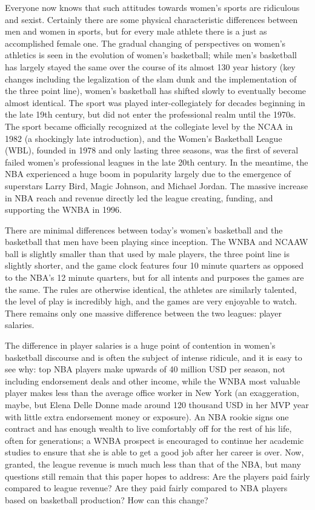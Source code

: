 \documentclass[12pt]{article}
\begin{document}
Everyone now knows that such attitudes towards women’s sports are ridiculous and sexist. Certainly there are some physical characteristic differences between men and women in sports, but for every male athlete there is a just as accomplished female one. The gradual changing of perspectives on women’s athletics is seen in the evolution of women’s basketball; while men’s basketball has largely stayed the same over the course of its almost 130 year history (key changes including the legalization of the slam dunk and the implementation of the three point line), women’s basketball has shifted slowly to eventually become almost identical. The sport was played inter-collegiately for decades beginning in the late 19th century, but did not enter the professional realm until the 1970s. The sport became officially recognized at the collegiate level by the NCAA in 1982 (a shockingly late introduction), and the Women’s Basketball League (WBL), founded in 1978 and only lasting three seasons, was the first of several failed women’s professional leagues in the late 20th century. In the meantime, the NBA experienced a huge boom in popularity largely due to the emergence of superstars Larry Bird, Magic Johnson, and Michael Jordan. The massive increase in NBA reach and revenue directly led the league creating, funding, and supporting the WNBA in 1996.
\par
There are minimal differences between today's women’s basketball and the basketball that men have been playing since inception. The WNBA and NCAAW ball is slightly smaller than that used by male players, the three point line is slightly shorter, and the game clock features four 10 minute quarters as opposed to the NBA’s 12 minute quarters, but for all intents and purposes the games are the same. The rules are otherwise identical, the athletes are similarly talented, the level of play is incredibly high, and the games are very enjoyable to watch. There remains only one massive difference between the two leagues: player salaries.
\par
The difference in player salaries is a huge point of contention in women’s basketball discourse and is often the subject of intense ridicule, and it is easy to see why: top NBA players make upwards of 40 million USD per season, not including endorsement deals and other income, while the WNBA most valuable player makes less than the average office worker in New York (an exaggeration, maybe, but Elena Delle Donne made around 120 thousand USD in her MVP year with little extra endorsement money or exposure). An NBA rookie signs one contract and has enough wealth to live comfortably off for the rest of his life, often for generations; a WNBA prospect is encouraged to continue her academic studies to ensure that she is able to get a good job after her career is over. Now, granted, the league revenue is much much less than that of the NBA, but many questions still remain that this paper hopes to address: Are the players paid fairly compared to league revenue? Are they paid fairly compared to NBA players based on basketball production? How can this change?
\end{document}
